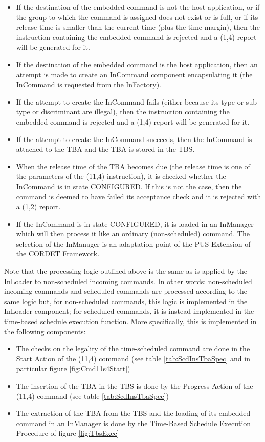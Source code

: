 \documentclass{pnp_article}
\begin{document}
\begin{itemize}
\item If the destination of the embedded command is not the host application, or if the group to which the command is assigned does not exist or is full, or if its release time is smaller than the current time (plus the time margin), then the instruction containing the embedded command is rejected and a (1,4) report will be generated for it.
\item If the destination of the embedded command is the host application, then an attempt is made to create an InCommand component encapsulating it (the InCommand is requested from the InFactory).
\item If the attempt to create the InCommand fails (either because its type or sub-type or discriminant are illegal), then the instruction containing the embedded command is rejected and a (1,4) report will be generated for it.
\item If the attempt to create the InCommand succeeds, then the InCommand is attached to the TBA and the TBA is stored in the TBS.
\item When the release time of the TBA becomes due (the release time is one of the parameters of the (11,4) instruction), it is checked whether the InCommand is in state CONFIGURED. If this is not the case, then the command is deemed to have failed its acceptance check and it is rejected with a (1,2) report.
\item If the InCommand is in state CONFIGURED, it is loaded in an InManager which will then process it like an ordinary (non-scheduled) command. The selection of the InManager is an adaptation point of the PUS Extension of the CORDET Framework.
\end{itemize}

Note that the processing logic outlined above is the same as is applied by the InLoader to non-scheduled incoming commands. In other words: non-scheduled incoming commands and scheduled commands are processed according to the same logic but, for non-scheduled commands, this logic is implemented in the InLoader component; for scheduled commands, it is instead implemented in the time-based schedule execution function. More specifically, this is implemented in the following components:

\begin{itemize}
\item The checks on the legality of the time-scheduled command are done in the Start Action of the (11,4) command (see table \ref{tab:ScdInsTbaSpec} and in particular figure \ref{fig:Cmd11s4Start})
\item The insertion of the TBA in the TBS is done by the Progress Action of the (11,4) command (see table \ref{tab:ScdInsTbaSpec})
\item The extraction of the TBA from the TBS and the loading of its embedded command in an InManager is done by the Time-Based Schedule Execution Procedure of figure \ref{fig:TbsExec}
\end{itemize}
\end{document}
